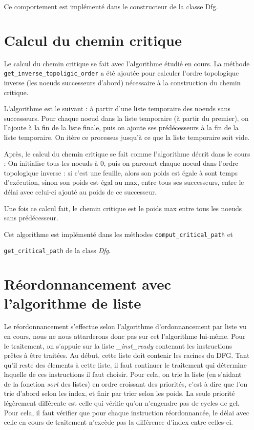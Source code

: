 \documentclass[a4paper, 11pt, notitlepage]{article}
\begin{document}
Ce comportement est implémenté dans le constructeur de la classe Dfg.

\section{Calcul du chemin critique}

Le calcul du chemin critique se fait avec l'algorithme étudié en cours. La
méthode \verb|get_inverse_topoligic_order| a été ajoutée pour calculer
l'ordre topologique inverse (les noeuds successeurs d'abord) nécessaire à la construction du chemin critique. 

L'algorithme est le suivant : à partir d'une liste temporaire des noeuds sans
successeurs. Pour chaque noeud dans la liste temporaire (à partir du premier), on
l'ajoute à la fin de la liste finale, puis on ajoute ses prédécesseurs à la fin
de la liste temporaire. On itère ce processus jusqu'à ce que la liste
temporaire soit vide.

Après, le calcul du chemin critique se fait comme l'algorithme décrit dans le cours :
On initialise tous les noeuds à 0, puis on parcourt chaque noeud dans l'ordre topologique inverse : si c'est une feuille, alors son poids est égale à sont temps d'exécution, sinon son poids est égal au max, entre tous ses successeurs, entre le délai avec celui-ci ajouté au poids de ce successeur.

Une fois ce calcul fait, le chemin critique est le poids max entre tous les noeuds sans prédécesseur.

Cet algorithme est implémenté dans les méthodes \verb|comput_critical_path| et 

\noindent
\verb|get_critical_path| de la class \emph{Dfg}.

\newpage
\section{Réordonnancement avec l'algorithme de liste}

Le réordonnancement s'effectue selon l'algorithme d'ordonnancement par liste vu en
cours, nous ne nous attarderons donc pas sur cet l'algorithme lui-même. 
Pour le traitement, on s'appuie sur la liste
\emph{\_inst\_ready} contenant les instructions prêtes à être
traitées. Au début, cette liste doit contenir les racines du DFG. Tant qu'il
reste des élements à cette liste, il faut continuer le traitement qui détermine
 laquelle de ces instructions il faut
choisir. Pour cela, on trie la liste (en s'aidant de la
fonction \emph{sort} des listes) en ordre croissant des priorités, c'est à
dire que l'on trie d'abord selon les index, et finir par trier selon
les poids. La seule priorité légèrement différente est celle qui vérifie
qu'on n'engendre pas de cycles de gel. Pour cela, il faut vérifier
que pour chaque instruction réordonnancée, le délai avec celle
en cours de traitement n'excède pas la différence d'index entre
celles-ci. 
\end{document}
